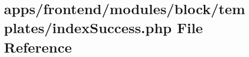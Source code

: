 \hypertarget{frontend_2modules_2block_2templates_2index_success_8php}{\section{apps/frontend/modules/block/templates/index\-Success.php File Reference}
\label{frontend_2modules_2block_2templates_2index_success_8php}
}
